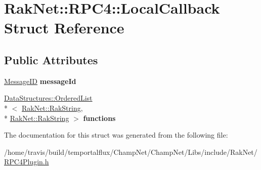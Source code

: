 \hypertarget{struct_rak_net_1_1_r_p_c4_1_1_local_callback}{\section{Rak\-Net\-:\-:R\-P\-C4\-:\-:Local\-Callback Struct Reference}
\label{struct_rak_net_1_1_r_p_c4_1_1_local_callback}
}
\subsection*{Public Attributes}
\begin{DoxyCompactItemize}
\item 
\hypertarget{struct_rak_net_1_1_r_p_c4_1_1_local_callback_ab70f797e88195aa11cad5f032fa84109}{\hyperlink{namespace_rak_net_a1b2f3bf4bad2bb6a8360a12295fbed0c}{Message\-I\-D} {\bfseries message\-Id}}\label{struct_rak_net_1_1_r_p_c4_1_1_local_callback_ab70f797e88195aa11cad5f032fa84109}

\item 
\hypertarget{struct_rak_net_1_1_r_p_c4_1_1_local_callback_a08b043acf6727beb203cd010caa202b1}{\hyperlink{class_data_structures_1_1_ordered_list}{Data\-Structures\-::\-Ordered\-List}\\*
$<$ \hyperlink{class_rak_net_1_1_rak_string}{Rak\-Net\-::\-Rak\-String}, \\*
\hyperlink{class_rak_net_1_1_rak_string}{Rak\-Net\-::\-Rak\-String} $>$ {\bfseries functions}}\label{struct_rak_net_1_1_r_p_c4_1_1_local_callback_a08b043acf6727beb203cd010caa202b1}

\end{DoxyCompactItemize}


The documentation for this struct was generated from the following file\-:\begin{DoxyCompactItemize}
\item 
/home/travis/build/temportalflux/\-Champ\-Net/\-Champ\-Net/\-Libs/include/\-Rak\-Net/\hyperlink{_r_p_c4_plugin_8h}{R\-P\-C4\-Plugin.\-h}\end{DoxyCompactItemize}
